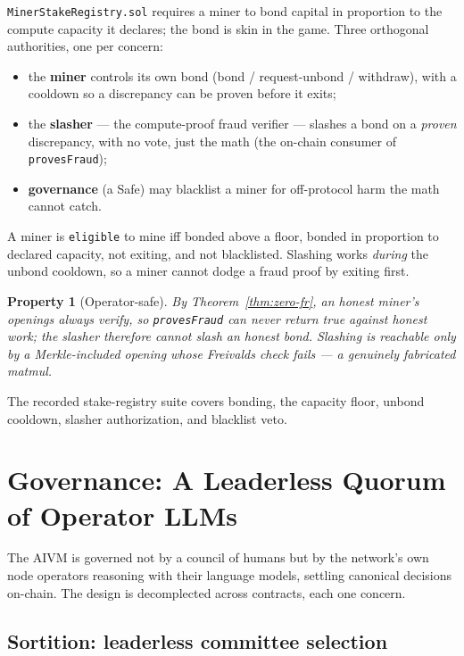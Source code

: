 \documentclass[11pt,a4paper]{article}
\newtheorem{property}{Property}
\begin{document}
\texttt{MinerStakeRegistry.sol} requires a miner to bond capital in proportion to the compute capacity it declares; the bond is skin in the game. Three orthogonal authorities, one per concern:
\begin{itemize}
  \item the \textbf{miner} controls its own bond (bond / request-unbond / withdraw), with a cooldown so a discrepancy can be proven before it exits;
  \item the \textbf{slasher} --- the compute-proof fraud verifier --- slashes a bond on a \emph{proven} discrepancy, with no vote, just the math (the on-chain consumer of \texttt{provesFraud});
  \item \textbf{governance} (a Safe) may blacklist a miner for off-protocol harm the math cannot catch.
\end{itemize}
A miner is \texttt{eligible} to mine iff bonded above a floor, bonded in proportion to declared capacity, not exiting, and not blacklisted. Slashing works \emph{during} the unbond cooldown, so a miner cannot dodge a fraud proof by exiting first.

\begin{property}[Operator-safe]\label{prop:operator-safe}
By Theorem~\ref{thm:zero-fr}, an honest miner's openings always verify, so \texttt{provesFraud} can never return true against honest work; the slasher therefore cannot slash an honest bond. Slashing is reachable only by a Merkle-included opening whose Freivalds check fails --- a genuinely fabricated matmul.
\end{property}

The recorded stake-registry suite covers bonding, the capacity floor, unbond cooldown, slasher authorization, and blacklist veto.

\section{Governance: A Leaderless Quorum of Operator LLMs}\label{sec:governance}

The AIVM is governed not by a council of humans but by the network's own node operators reasoning with their language models, settling canonical decisions on-chain. The design is decomplected across contracts, each one concern.

\subsection{Sortition: leaderless committee selection}\label{sec:sortition}
\end{document}
